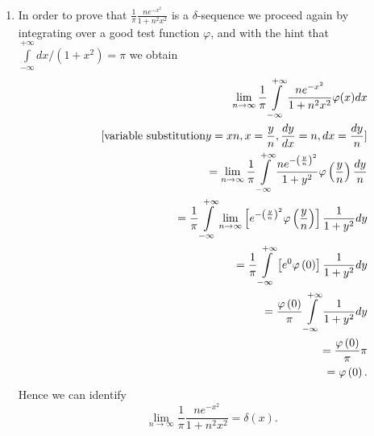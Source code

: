 {\begin{enumerate}
 \item
In order to prove that $\frac{1}{\pi} \frac{n  e^{-x^2}}{1+n^2x^2} $ is  a  $\delta$-sequence
we proceed again by integrating over a good test function $\varphi$,
and with the hint that $\int\limits_{-\infty}^{+\infty} dx/ (1+x^2) =\pi$ we obtain
 \begin{equation}
\begin{split}
\lim_{n \rightarrow \infty}  \frac{1}{\pi}
\int\limits_{-\infty}^{+\infty}
\frac{n  e^{-x^2}}{1+n^2x^2}
   \varphi(x)
dx
\\ \qquad \qquad \textrm{[variable substitution}  y={xn} , x={y\over n}, {dy\over dx}={n}, dx={dy\over n}
\textrm{]}
\\ \qquad =
\lim_{n \rightarrow \infty}   \frac{1}{\pi}
\int\limits_{-\infty}^{+\infty}
\frac{n  e^{-\left( \frac{y}{n} \right)^2}}{1+y^2}
   \varphi \left( \frac{y}{n} \right)
\frac{dy}{n}
\\ \qquad =
\frac{1}{\pi}
\int\limits_{-\infty}^{+\infty}
\lim_{n \rightarrow \infty}  \left[     e^{-\left( \frac{y}{n} \right)^2}  \varphi \left( \frac{y}{n} \right) \right]
\frac{1}{1+y^2}
dy
\\ \qquad =       \frac{1}{\pi}
\int\limits_{-\infty}^{+\infty}
\left[     e^{0}  \varphi \left( 0\right) \right]
\frac{1}{1+y^2}
dy
\\ \qquad =    \frac{\varphi \left( 0\right)}{\pi}
\int\limits_{-\infty}^{+\infty}
\frac{1}{1+y^2}
dy
\\ \qquad =
\frac{\varphi \left( 0\right)}{\pi} \pi
\\ \qquad =
\varphi \left( 0\right).
\end{split}
\end{equation}
Hence we can identify
\begin{equation}
   \lim_{n \rightarrow \infty}{\frac{1}{\pi} \frac{n  e^{-x^2}}{1+n^2x^2}}=\delta(x).
\end{equation}


\end{enumerate}}
